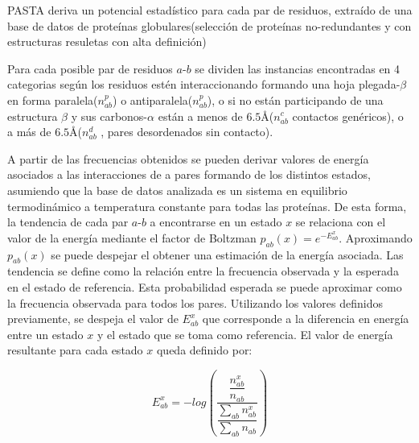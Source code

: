 PASTA deriva un potencial estadístico para cada par de residuos, extraído de una base de datos de proteínas globulares(selección de proteínas no-redundantes y con estructuras resuletas con alta definición)

Para cada posible par de residuos $a$-$b$ se dividen las instancias encontradas en 4 categorias según los residuos estén interaccionando formando una hoja plegada-$\beta$ en forma paralela($n_{ab}^p$) o antiparalela($n_{ab}^p$), 
o si no están participando de una estructura $\beta$ y sus carbonos-$\alpha$ están a menos de $6.5$\AA ($n_{ab}^c$ contactos genéricos), o a más de $6.5$\AA ($n_{ab}^d$ , pares desordenados sin contacto). 

A partir de las frecuencias obtenidos se pueden derivar valores de energía asociados a las interacciones de a pares formando de los distintos estados, asumiendo que la base de datos analizada es un sistema en equilibrio termodinámico 
a temperatura constante para todas las proteínas.
De esta forma, la tendencia de cada par $a$-$b$ a encontrarse en un estado $x$ se relaciona con el valor de la energía mediante el factor de Boltzman $p_{ab}(x)= e^{-E_{ab}^x}$. 
Aproximando $p_{ab}(x)$ se puede despejar el obtener una estimación de la energía asociada.
Las tendencia se define como la relación entre la frecuencia observada y la esperada en el estado de referencia. Esta probabilidad esperada se puede aproximar como la frecuencia observada para todos los pares.
Utilizando los valores definidos previamente, se despeja el valor de $E_{ab}^x$ que corresponde a la diferencia en energía entre un estado $x$ y el estado que se toma como referencia.
El valor de energía resultante para cada estado $x$ queda definido por:

\begin{equation}
{E_{ab}^x = -log\left(\dfrac{\dfrac{n_{ab}^x}{n_{ab}}} {\dfrac{\sum\limits_{ab} n_{ab}^x}{\sum\limits_{ab} n_{ab}}}\right)}
\end{equation}


